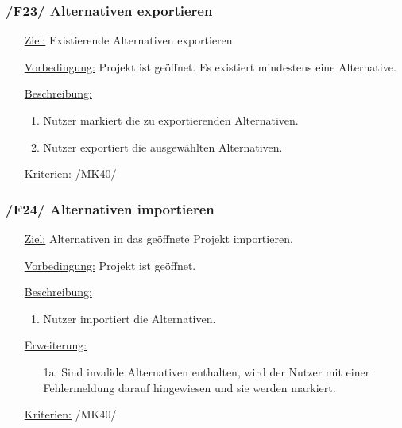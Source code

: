 \documentclass{article}
\begin{document}
\subsubsection*{\textbf{/F23/} Alternativen exportieren} \label{sec:f:Alternativen exportieren}
\begin{itemize}
    \item[\underline{Ziel:}] Existierende Alternativen exportieren.
    \item[\underline{Vorbedingung:}] Projekt ist geöffnet. Es existiert mindestens eine Alternative.
    \item[\underline{Beschreibung:}]
    \begin{enumerate}
        \item Nutzer markiert die zu exportierenden Alternativen.
        \item Nutzer exportiert die ausgewählten Alternativen. 
    \end{enumerate}
    \item[\underline{Kriterien:}] /MK40/
\end{itemize}

\subsubsection*{\textbf{/F24/} Alternativen importieren}
\label{sec:f:Alternativen importieren}
\begin{itemize}
    \item[\underline{Ziel:}] Alternativen in das geöffnete Projekt importieren.
    \item[\underline{Vorbedingung:}] Projekt ist geöffnet.
    \item[\underline{Beschreibung:}]
    \begin{enumerate}
        \item Nutzer importiert die Alternativen. 
    \end{enumerate}
    \item[\underline{Erweiterung:}]
    \begin{itemize}
        \item[1a.] Sind invalide Alternativen enthalten, wird der Nutzer mit einer Fehlermeldung darauf hingewiesen und sie werden markiert. 
    \end{itemize}
    \item[\underline{Kriterien:}] /MK40/
\end{itemize}
\end{document}
